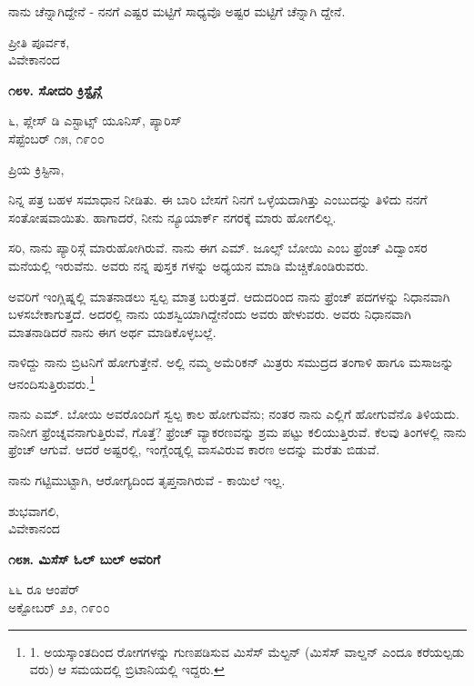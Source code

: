 ನಾನು ಚೆನ್ನಾಗಿದ್ದೇನೆ - ನನಗೆ ಎಷ್ಟರ ಮಟ್ಟಿಗೆ ಸಾಧ್ಯವೊ ಅಷ್ಟರ ಮಟ್ಟಿಗೆ ಚೆನ್ನಾಗಿ ದ್ದೇನೆ.

\begin{flushright}
ಪ್ರೀತಿ ಪೂರ್ವಕ,\\ವಿವೇಕಾನಂದ
\end{flushright}

\begin{center}
\textbf{೧೮೪. ಸೋದರಿ ಕ್ರಿಸ್ಟೈನ್ಗೆ}
\end{center}

\begin{flushright}
೬, ಪ್ಲೇಸ್ ಡಿ ಎಸ್ಟಾಟ್ಸ್ ಯೂನಿಸ್, ಪ್ಯಾರಿಸ್\\ಸೆಪ್ಟೆಂಬರ್ ೧೫, ೧೯೦೦
\end{flushright}

ಪ್ರಿಯ ಕ್ರಿಸ್ಟಿನಾ,

ನಿನ್ನ ಪತ್ರ ಬಹಳ ಸಮಾಧಾನ ನೀಡಿತು. ಈ ಬಾರಿ ಬೇಸಗೆ ನಿನಗೆ ಒಳ್ಳೆಯದಾಗಿತ್ತು ಎಂಬುದನ್ನು ತಿಳಿದು ನನಗೆ ಸಂತೋಷವಾಯಿತು. ಹಾಗಾದರೆ, ನೀನು ನ್ಯೂಯಾರ್ಕ್ ನಗರಕ್ಕೆ ಮಾರು ಹೋಗಲಿಲ್ಲ.

ಸರಿ, ನಾನು ಪ್ಯಾರಿಸ್ಗೆ ಮಾರುಹೋಗಿರುವೆ. ನಾನು ಈಗ ಎಮ್​. ಜೂಲ್ಸ್ ಬೋಯಿ ಎಂಬ ಫ್ರೆಂಚ್ ವಿದ್ವಾಂಸರ ಮನೆಯಲ್ಲಿ ಇರುವೆನು. ಅವರು ನನ್ನ ಪುಸ್ತಕ ಗಳನ್ನು ಅಧ್ಯಯನ ಮಾಡಿ ಮೆಚ್ಚಿಕೊಂಡಿರುವರು.

ಅವರಿಗೆ ಇಂಗ್ಲಿಷ್ನಲ್ಲಿ ಮಾತನಾಡಲು ಸ್ವಲ್ಪ ಮಾತ್ರ ಬರುತ್ತದೆ. ಆದುದರಿಂದ ನಾನು ಫ್ರೆಂಚ್ ಪದಗಳನ್ನು ನಿಧಾನವಾಗಿ ಬಳಸಬೇಕಾಗುತ್ತದೆ. ಅದರಲ್ಲಿ ನಾನು ಯಶಸ್ವಿಯಾಗಿದ್ದೇನೆಂದು ಅವರು ಹೇಳುವರು. ಅವರು ನಿಧಾನವಾಗಿ ಮಾತನಾಡಿದರೆ ನಾನು ಈಗ ಅರ್ಥ ಮಾಡಿಕೊಳ್ಳಬಲ್ಲೆ.

ನಾಳಿದ್ದು ನಾನು ಬ್ರಿಟನಿಗೆ ಹೋಗುತ್ತೇನೆ. ಅಲ್ಲಿ ನಮ್ಮ ಅಮೆರಿಕನ್ ಮಿತ್ರರು ಸಮುದ್ರದ ತಂಗಾಳಿ ಹಾಗೂ ಮಸಾಜನ್ನು ಆನಂದಿಸುತ್ತಿರುವರು.\footnote{1. ಅಯಸ್ಕಾಂತದಿಂದ ರೋಗಗಳನ್ನು ಗುಣಪಡಿಸುವ ಮಿಸೆಸ್ ಮೆಲ್ಟನ್ (ಮಿಸೆಸ್ ವಾಲ್ಡನ್ ಎಂದೂ ಕರೆಯಲ್ಪಡು ವರು) ಆ ಸಮಯದಲ್ಲಿ ಬ್ರಿಟಾನಿಯಲ್ಲಿ ಇದ್ದರು.}

ನಾನು ಎಮ್​. ಬೋಯಿ ಅವರೊಂದಿಗೆ ಸ್ವಲ್ಪ ಕಾಲ ಹೋಗುವೆನು; ನಂತರ ನಾನು ಎಲ್ಲಿಗೆ ಹೋಗುವೆನೊ ತಿಳಿಯದು. ನಾನೀಗ ಫ್ರೆಂಚ್ನವನಾಗುತ್ತಿರುವೆ, ಗೊತ್ತೆ? ಫ್ರೆಂಚ್ ವ್ಯಾಕರಣವನ್ನು ಶ್ರಮ ಪಟ್ಟು ಕಲಿಯುತ್ತಿರುವೆ. ಕೆಲವು ತಿಂಗಳಲ್ಲಿ ನಾನು ಫ್ರೆಂಚ್ ಆಗುವೆ. ಆದರೆ ಅಷ್ಟರಲ್ಲಿ, ಇಂಗ್ಲೆಂಡ್ನಲ್ಲಿ ವಾಸವಿರುವ ಕಾರಣ ಅದನ್ನು ಮರೆತು ಬಿಡುವೆ.

ನಾನು ಗಟ್ಟಿಮುಟ್ಟಾಗಿ, ಆರೋಗ್ಯದಿಂದ ತೃಪ್ತನಾಗಿರುವೆ - ಕಾಯಿಲೆ ಇಲ್ಲ.

\begin{flushright}
ಶುಭವಾಗಲಿ,\\ವಿವೇಕಾನಂದ
\end{flushright}

\begin{center}
\textbf{೧೮೫. ಮಿಸೆಸ್ ಓಲ್ ಬುಲ್ ಅವರಿಗೆ}
\end{center}

\begin{flushright}
೬೬ ರೂ ಆಂಪೆರ್\\ಅಕ್ಟೋಬರ್ ೨೨, ೧೯೦೦
\end{flushright}

